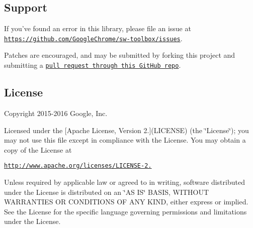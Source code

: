 \subsection*{Support}

If you’ve found an error in this library, please file an issue at \href{https://github.com/GoogleChrome/sw-toolbox/issues}{\tt https\+://github.\+com/\+Google\+Chrome/sw-\/toolbox/issues}.

Patches are encouraged, and may be submitted by forking this project and submitting a \href{https://github.com/GoogleChrome/sw-toolbox/pulls}{\tt pull request through this Git\+Hub repo}.

\subsection*{License}

Copyright 2015-\/2016 Google, Inc.

Licensed under the \mbox{[}Apache License, Version 2.\mbox{]}(L\+I\+C\+E\+N\+SE) (the \char`\"{}\+License\char`\"{}); you may not use this file except in compliance with the License. You may obtain a copy of the License at

\href{http://www.apache.org/licenses/LICENSE-2.0}{\tt http\+://www.\+apache.\+org/licenses/\+L\+I\+C\+E\+N\+S\+E-\/2.}

Unless required by applicable law or agreed to in writing, software distributed under the License is distributed on an \char`\"{}\+A\+S I\+S\char`\"{} B\+A\+S\+IS, W\+I\+T\+H\+O\+UT W\+A\+R\+R\+A\+N\+T\+I\+ES OR C\+O\+N\+D\+I\+T\+I\+O\+NS OF A\+NY K\+I\+ND, either express or implied. See the License for the specific language governing permissions and limitations under the License. 